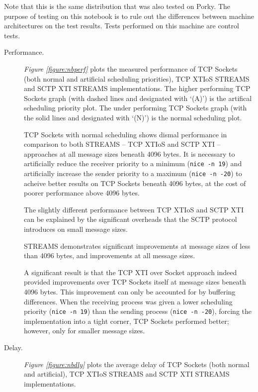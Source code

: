 \documentclass[letterpaper,final,notitlepage,twocolumn,10pt,twoside]{article}
\begin{document}
Note that this is the same distribution that was also tested on Porky.  The purpose of testing on
this notebook is to rule out the differences between machine architectures on the test results.
Tests performed on this machine are control tests.

\begin{description}

\item[Performance.]

\textit{Figure \ref{figure:nbperf}}
plots the measured performance of TCP Sockets (both normal and artificial scheduling priorities),
TCP XTIoS STREAMS and SCTP XTI STREAMS implementations.
The higher performing TCP Sockets graph (with dashed lines and designated with `(A)') is the
artifical scheduling priority plot.  The under performing TCP Sockets graph (with the solid lines
and designated with `(N)') is the normal scheduling plot.

TCP Sockets with normal scheduling shows dismal performance in comparison to both STREAMS -- TCP
XTIoS and SCTP XTI -- approaches at all message sizes beneath 4096 bytes.  It is necessary to
artificially reduce the receiver priority to a minimum (\texttt{nice -n 19}) and artificially
increase the sender priority to a maximum (\texttt{nice -n -20}) to acheive better results on TCP
Sockets beneath 4096 bytes, at the cost of poorer performance above 4096 bytes.

The slightly different performance between TCP XTIoS and SCTP XTI can be explained by the
significant overheads that the SCTP protocol introduces on small message sizes.

STREAMS demonstrates significant improvements at message sizes of less than 4096 bytes, and
improvements at all message sizes.

A significant result is that the TCP XTI over Socket approach indeed provided improvements over TCP
Sockets itself at message sizes beneath 4096 bytes.  This improvement can only be accounted for by
buffering differences.  When the receiving process was given a lower scheduling priority
(\texttt{nice -n 19}) than the sending process (\texttt{nice -n -20}), forcing the implementation
into a tight corner, TCP Sockets performed better; however, only for smaller message sizes.

\item[Delay.]

\textit{Figure \ref{figure:nbdly}}
plots the average delay of TCP Sockets (both normal and artificial), TCP XTIoS STREAMS and SCTP XTI
STREAMS implementations.


\end{description}
\end{document}
